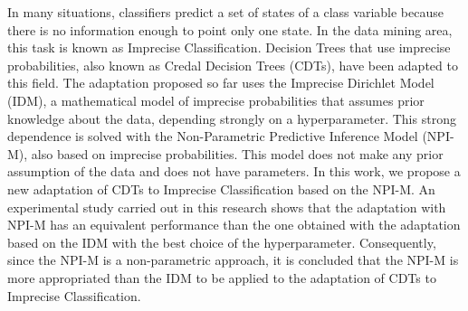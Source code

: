 

In many situations, classifiers predict a set of states of a class variable because there is no information enough to point only one state. In the data mining area, this task is known as Imprecise Classification. Decision Trees that use imprecise probabilities, also known as Credal Decision Trees (CDTs), have been adapted to this field. The adaptation proposed so far uses the Imprecise Dirichlet Model (IDM), a mathematical model of imprecise probabilities that assumes prior knowledge about the data, depending strongly on a hyperparameter. This strong dependence is solved with the Non-Parametric Predictive Inference Model (NPI-M), also based on imprecise probabilities. This model does not make any prior assumption of the data and does not have parameters. In this work, we propose a new adaptation of CDTs to Imprecise Classification based on the NPI-M. An experimental study carried out in this research shows that the adaptation with NPI-M has an equivalent performance than the one obtained with the adaptation based on the IDM with the best choice of the hyperparameter.  Consequently, since the NPI-M is a non-parametric approach, it is concluded that the NPI-M is more appropriated than the IDM to be applied to the adaptation of CDTs to Imprecise Classification. 


